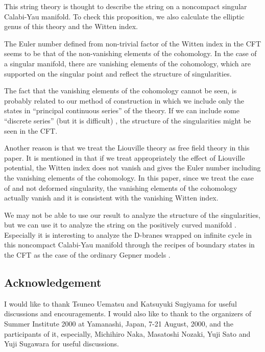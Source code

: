 \documentclass[a4paper,12pt]{article}
\numberwithin{equation}{section}
\providecommand{\Cx}{{\mathbb C}^{\times}}
\providecommand{\Ncal}{{\cal N}}
\begin{document}
This string theory is thought to describe the string on
a noncompact singular Calabi-Yau manifold.
To check this proposition,
we also calculate the elliptic genus of this theory
and the Witten index.

The Euler number defined from
non-trivial factor of the Witten index in the CFT 
seems to be that of the non-vanishing 
elements of the cohomology.
In the case of a singular manifold, there are
vanishing elements of the cohomology, which are supported on
the singular point and reflect the structure of singularities.

The fact that
the vanishing elements of the cohomology cannot be seen,
is probably related
to our method of construction in which we include
only the states in ``principal continuous series'' of the
\coordHE{} theory.
If we can include some ``discrete series''
(but it is difficult\cite{KS0001})
, the structure of the singularities
might be seen in the CFT.

Another reason is 
that we treat the \myHighlight{$\Ncal=2$}\coordHE{} Liouville theory as free field theory in
this paper.
It is mentioned in \cite{ES0009} that if we treat appropriately
the effect of Liouville potential, the Witten index does not
vanish and gives the Euler number including the vanishing elements of
the cohomology.
In this paper, since we treat the case of \coordHE{} and not deformed
singularity, the vanishing elements of the cohomology actually 
vanish and it is consistent with the vanishing Witten index.

We may not be able to use our result to 
analyze the structure of the singularities,
but we can use it to analyze the string on the 
positively curved manifold \myHighlight{$X/\Cx$}\coordHE{}. Especially it is
interesting to analyze the D-branes wrapped on infinite cycle
in this noncompact Calabi-Yau manifold through the recipes of
 boundary states in the CFT \cite{EGKRS0005,Ler0006,LLS0006,ES0009}
 as the case of the ordinary Gepner models
\cite{RS9712,BDLR9906,NN0001,Sug0003A}.

\subsection*{Acknowledgement}

I would like to thank Tsuneo Uematsu and Katsuyuki Sugiyama
for useful discussions and encouragements.
I would also like to thank to the organizers 
of Summer Institute 2000 at Yamanashi,
Japan, 7-21 August, 2000, and the participants of it, especially,
Michihiro Naka, Masatoshi Nozaki, Yuji Sato and Yuji Sugawara
for useful discussions.
\end{document}
